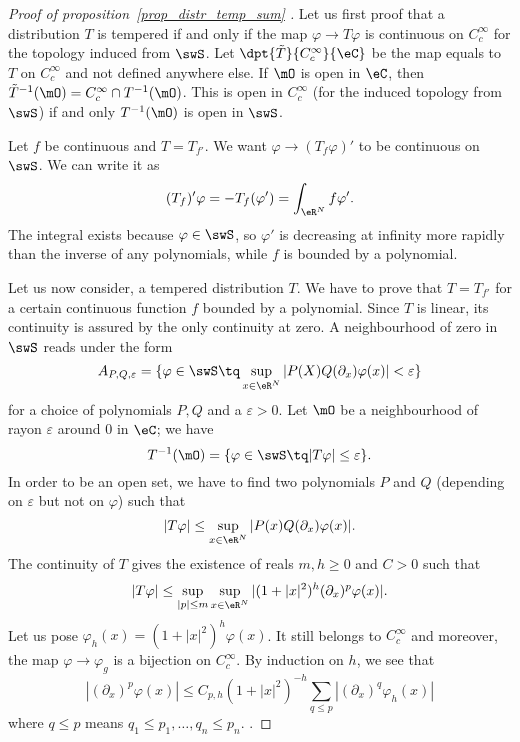 \begin{proof}[Proof of proposition~\ref{prop_distr_temp_sum} ]
	Let us first proof that a distribution $T$ is tempered if and only if the map $\varphi\to T\varphi$ is continuous on $ C^{\infty}_c$ for the topology induced from $\swS$. Let $\dpt{\tilde T}{ C^{\infty}_c}{\eC}$ be the map equals to $T$ on $ C^{\infty}_c$ and not defined anywhere else. If $\mO$ is open in $\eC$, then $\tilde T^{-1}(\mO)= C^{\infty}_c\cap T^{-1}(\mO)$. This is open in $ C^{\infty}_c$ (for the induced topology from $\swS$) if and only $T^{-1}(\mO)$ is open in $\swS$.


	Let $f$ be continuous and $T=T_{f'}$. We want $\varphi\to(T_f\varphi)'$ to be continuous on $\swS$. We can write it as
	\[
		(T_f)'\varphi=-T_f(\varphi')=\int_{\eR^N}f\varphi'.
	\]
	The integral exists because $\varphi\in\swS$, so $\varphi'$ is decreasing at infinity more rapidly than the inverse of any polynomials, while $f$ is bounded by a polynomial.

	Let us now consider, a tempered distribution $T$. We have to prove that $T=T_{f'}$ for a certain continuous function $f$ bounded by a polynomial. Since $T$ is linear, its continuity is assured by the only continuity at zero. A neighbourhood of zero in $\swS$ reads under the form
	\[
		A_{P,Q,\varepsilon}=\{ \varphi\in\swS\tq \sup_{x\in\eR^N}| P(X)Q(\partial_x)\varphi(x) |<\varepsilon \}
	\]
	for a choice of polynomials $P,Q$ and a $\varepsilon>0$. Let $\mO$ be a neighbourhood of rayon $\varepsilon$ around $0$ in $\eC$; we have
	\[
		T^{-1}(\mO)=\{ \varphi\in\swS\tq | T\varphi |\leq \varepsilon \}.
	\]
	In order to be an open set, we have to find two polynomials $P$ and $Q$ (depending on $\varepsilon$ but not on $\varphi$) such that
	\[
		| T\varphi |\leq \sup_{x\in\eR^N}| P(x)Q(\partial_x)\varphi(x) |.
	\]
	The continuity of $T$ gives the existence of reals $m,h\geq 0$ and $C>0$ such that
	\[
		| T\varphi |\leq \sup_{| p |\leq m}\sup_{x\in\eR^N}| (1+| x |^2)^h(\partial_x)^p\varphi(x) |.
	\]
	Let us pose $\varphi_h(x)=(1+| x |^2)^h\varphi(x)$. It still belongs to $   C^{\infty}_c$ and moreover, the map $\varphi\to\varphi_g$ is a bijection on $ C^{\infty}_c$. By induction on $h$, we see that
	\begin{equation}
		| (\partial_x)^p\varphi(x) |\leq C_{p,h}(1+| x |^2)^{-h}\sum_{q\leq p}| (\partial_x)^q\varphi_h(x) |
	\end{equation}
	where $q\leq p$ means $q_1\leq p_1,\ldots, q_n\leq p_n$.
	.

\end{proof}

